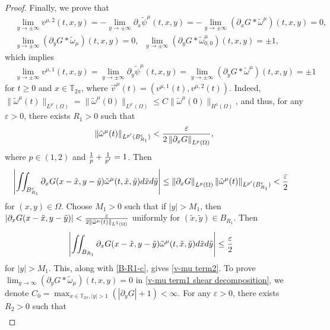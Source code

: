 \documentclass[1 [leqno, 11pt]{amsart}
\numberwithin{equation}{section}
\begin{document}
\begin{CJK*}{GBK}{song}
\begin{appendix}
\begin{proof}
Finally, we prove that
\begin{align}\label{v-mu term2}
&\lim_{y\to\pm\infty}v^{\mu,2}(t,x,y)=-\lim_{y\to\pm\infty}\partial_x\tilde\psi^\mu(t,x,y)=-\lim_{y\to\pm\infty}(\partial_x G\ast\tilde \omega^\mu)(t,x,y)=0,\\
&\lim_{y\to\pm\infty}(\partial_y G\ast\tilde \omega_\mu)(t,x,y)=0,\;\;\lim_{y\to\pm\infty}(\partial_y G\ast\tilde \omega_{0,0}^\mu)(t,x,y)=\pm1,
\label{v-mu term1 shear decomposition}
\end{align}
which implies
\begin{align}
\label{v-mu term1}
&\lim_{y\to\pm\infty}v^{\mu,1}(t,x,y)=\lim_{y\to\pm\infty}\partial_y\tilde\psi^\mu(t,x,y)=\lim_{y\to\pm\infty}(\partial_y G\ast\tilde \omega^\mu)(t,x,y)=\pm1
\end{align}
for $t\geq0$ and $x\in\mathbb{T}_{2\pi}$, where $\vec{v}^{\mu}(t)=(v^{\mu,1}(t),v^{\mu,2}(t))$.
Indeed, $\|\tilde \omega^\mu(t)\|_{L^{p'}(\Omega)}=\|\tilde \omega^\mu(0)\|_{L^{p'}(\Omega)}\leq C\|\tilde \omega^\mu(0)\|_{H^{1}(\Omega)}$, and thus, for any $\varepsilon>0$,  there exists $R_1>0$ such that
\begin{align*}
\|\tilde \omega^\mu(t)\|_{L^{p'}(B_{R_1}^c)}<{\varepsilon\over 2\left\|\partial_x G\right\|_{L^{p}(\Omega)}},
\end{align*}
where $p\in(1,2)$ and ${1\over p}+{1\over p'}=1$. Then
\begin{align}\label{B-R1-c}
&\left|\iint_{B_{R_1}^c}\partial_x G(x-\tilde x,y-\tilde y)\tilde \omega^\mu(t,\tilde x,\tilde y)d\tilde xd\tilde y\right|
\leq\left\|\partial_x G\right\|_{L^{p}(\Omega)}
\|\tilde \omega^\mu(t)\|_{L^{p'}(B_{R_1}^c)}<{\varepsilon\over 2}
\end{align}
for $(x,y)\in\Omega$. Choose $M_1>0$ such that if $|y|>M_1$, then  $\left|\partial_x G(x-\tilde x,y-\tilde y)\right|<{\varepsilon\over 2\|\tilde \omega^\mu(t)\|_{L^1(\Omega)}}$ uniformly for $(\tilde x,\tilde y)\in B_{R_1}$. Then
\begin{align*}
&\left|\iint_{B_{R_1}}\partial_x G(x-\tilde x,y-\tilde y)\tilde \omega^\mu(t,\tilde x,\tilde y)d\tilde xd\tilde y\right|\leq{\varepsilon\over 2}
\end{align*}
for $|y|>M_1$. This, along with \eqref{B-R1-c}, gives   \eqref{v-mu term2}.
 To prove $\lim_{y\to\infty}(\partial_y G\ast\tilde \omega_\mu)(t,x,y)=0$ in \eqref{v-mu term1 shear decomposition}, we denote $C_0=\max_{x\in\mathbb{T}_{2\pi},|y|>1}(|\partial_y G|+1)<\infty$. For any $\varepsilon>0$, there exists $R_2>0$ such that
\begin{align*}

\end{align*}
\end{proof}
\end{appendix}
\end{CJK*}
\end{document}
